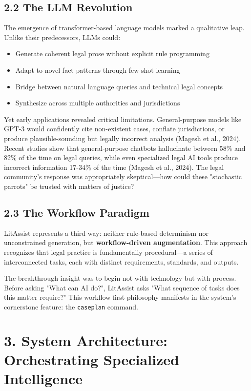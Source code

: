 \documentclass[12pt,a4paper]{article}
\begin{document}
\subsection*{2.2 The LLM Revolution}

The emergence of transformer-based language models marked a qualitative leap. Unlike their predecessors, LLMs could:
\begin{itemize}
\item Generate coherent legal prose without explicit rule programming
\item Adapt to novel fact patterns through few-shot learning
\item Bridge between natural language queries and technical legal concepts
\item Synthesize across multiple authorities and jurisdictions
\end{itemize}

Yet early applications revealed critical limitations. General-purpose models like GPT-3 would confidently cite non-existent cases, conflate jurisdictions, or produce plausible-sounding but legally incorrect analysis (Magesh et al., 2024). Recent studies show that general-purpose chatbots hallucinate between 58\% and 82\% of the time on legal queries, while even specialized legal AI tools produce incorrect information 17-34\% of the time (Magesh et al., 2024). The legal community's response was appropriately skeptical—how could these "stochastic parrots" be trusted with matters of justice?

\subsection*{2.3 The Workflow Paradigm}

LitAssist represents a third way: neither rule-based determinism nor unconstrained generation, but \textbf{workflow-driven augmentation}. This approach recognizes that legal practice is fundamentally procedural—a series of interconnected tasks, each with distinct requirements, standards, and outputs.

The breakthrough insight was to begin not with technology but with process. Before asking "What can AI do?", LitAssist asks "What sequence of tasks does this matter require?" This workflow-first philosophy manifests in the system's cornerstone feature: the \texttt{caseplan} command.

\section*{3. System Architecture: Orchestrating Specialized Intelligence}
\end{document}
